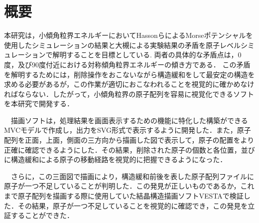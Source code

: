 \section{概要}
本研究は，小傾角粒界エネルギーにおいてHassonらによるMorseポテンシャルを使用したシミュレーションの結果と大槻による実験結果の矛盾を原子レベルシミュレーションで解明することを目標としている.
両者の具体的な矛盾点は，0度，及び90度付近における対称傾角粒界エネルギーの傾き方である．
この矛盾を解明するためには，削除操作をおこないながら構造緩和をして最安定の構造を求める必要があるが，この作業が適切におこなわれることを視覚的に確かめなければならない．したがって，小傾角粒界の原子配列を容易に視覚化できるソフトを本研究で開発する．

　描画ソフトは，処理結果を画面表示するための機能に特化した構築ができるMVCモデルで作成し，出力をSVG形式で表示するように開発した．また，原子配列を正面，上面，側面の三方向から描画した図で表示して，原子の配置をより正確に確認できるようにした．その結果，削除された原子の個数と各位置，並びに構造緩和による原子の移動経路を視覚的に把握できるようになった．

　さらに，この三面図で描画により，構造緩和前後を表した原子配列ファイルに原子が一つ不足していることが判明した．この発見が正しいものであるか，これまで原子配列を描画する際に使用していた結晶構造描画ソフトVESTAで検証した．その結果，原子が一つ不足していることを視覚的に確認でき，この発見を立証することができた．

